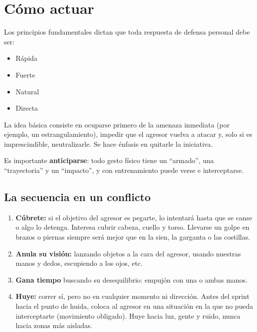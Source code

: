 \chapter{Cómo actuar}

Los principios fundamentales dictan que toda respuesta de defensa personal debe ser:

\begin{itemize}
  \item Rápida
  \item Fuerte
  \item Natural
  \item Directa
\end{itemize}

La idea básica consiste en ocuparse primero de la amenaza inmediata (por ejemplo, un estrangulamiento), impedir que el agresor vuelva a atacar y, solo si es imprescindible, neutralizarle. Se hace énfasis en quitarle la iniciativa.

Es importante \textbf{anticiparse}: todo gesto físico tiene un \enquote{armado}, una \enquote{trayectoria} y un \enquote{impacto}, y con entrenamiento puede verse e interceptarse.

\section{La secuencia en un conflicto}

\begin{enumerate}
  \item \textbf{Cúbrete:} si el objetivo del agresor es pegarte, lo intentará hasta que se canse o algo lo detenga. Interesa cubrir cabeza, cuello y torso. Llevarse un golpe en brazos o piernas siempre será mejor que en la sien, la garganta o las costillas.
  \item \textbf{Anula su visión:} lanzando objetos a la cara del agresor, usando nuestras manos y dedos, escupiendo a los ojos, etc.
  \item \textbf{Gana tiempo} buscando su desequilibrio: empujón con una o ambas manos.
  \item \textbf{Huye:} correr sí, pero no en cualquier momento ni dirección. Antes del sprint hacia el punto de huida, coloca al agresor en una situación en la que no pueda interceptarte (movimiento obligado). Huye hacia luz, gente y ruido, nunca hacia zonas más aisladas.
\end{enumerate}

